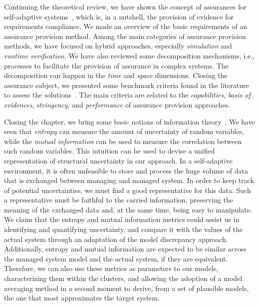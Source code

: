 Continuing the theoretical review, we have shown the concept of assurances for self-adaptive systems~\cite{Weyns2016PerpetualAF}, which is, in a nutshell, the provision of evidence for requirements compliance. We made an overview of the basic requirements of an assurance provision method. Among the main categories of assurance provision methods, we have focused on hybrid approaches, especially \textit{simulation} and \textit{runtime verification}. We have also reviewed some decomposition mechanisms, i.e., processes to facilitate the provision of assurance in complex systems. The decomposition can happen in the \textit{time} and \textit{space} dimensions. Closing the assurance subject, we presented some benchmark criteria found in the literature to assess the solutions~\cite{Weyns2016PerpetualAF}. The main criteria are related to the \textit{capabilities}, \textit{basis of evidences}, \textit{stringency}, and \textit{performance} of assurance provision approaches.

Closing the chapter, we bring some basic notions of information theory~\cite{shannon1948mathematical}. We have seen that \textit{entropy} can measure the amount of uncertainty of random variables, while the \textit{mutual information} can be used to measure the correlation between such random variables. This intuition can be used to devise a unified representation of structural uncertainty in our approach. In a self-adaptive environment, it is often unfeasible to store and process the huge volume of data that is exchanged between managing and managed system. In order to keep track of potential uncertainties, we must find a good representative for this data. Such a representative must be faithful to the carried information, preserving the meaning of the exchanged data and, at the same time, being easy to manipulate. We claim that the entropy and mutual information metrics could assist us in identifying and quantifying uncertainty, and compare it with the values of the actual system through an adaptation of the model discrepancy approach. Additionally, entropy and mutual information are expected to be similar across the managed system model and the actual system, if they are equivalent. Therefore, we can also use these metrics as parameters to our models, characterizing them within the clusters, and allowing the adoption of a model averaging method in a second moment to derive, from a set of plausible models, the one that most approximates the target system.